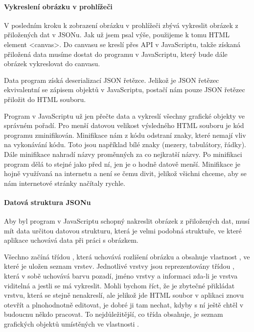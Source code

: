 \documentclass[
  field=inf,
  biblatex,
  glossaries,
  index
]{kidiplom}
\begin{document}
\paragraph{Vykreslení obrázku v prohlížeči}
V posledním kroku k zobrazení obrázku v prohlížeči zbývá vykreslit obrázek z přiložených dat v JSONu. Jak už jsem psal výše, použijeme k tomu HTML element <canvas>. Do canvasu se kreslí přes API v JavaScriptu, takže získaná přiložená data musíme dostat do programu v JavaScriptu, který bude dále obrázek vykreslovat do canvasu. 

Data program získá deserializací JSON řetězce. Jelikož je JSON řetězec ekvivalentní se zápisem objektů v JavaScriptu, postačí nám pouze JSON řetězec přiložit do HTML souboru.

Program v JavaScriptu už jen přečte data a vykreslí všechny grafické objekty ve správném pořadí. Pro menší datovou velikost výsledného HTML souboru je kód programu zminifikován. Minifikace nám z kódu odstraní znaky, které nemají vliv na vykonávání kódu. Toto jsou například bílé znaky (mezery, tabulátory, řádky). Dále minifikace nahradí názvy proměnných za co nejkratší názvy. Po minifikaci program dělá to stejné jako před ní, jen je o hodně datově menší. Minifikace je hojně využívaná na internetu a není se čemu divit, jelikož všichni chceme, aby se nám internetové stránky načítaly rychle.

\paragraph{Datová struktura JSONu}
Aby byl program v JavaScriptu schopný nakreslit obrázek z přiložených dat, musí mít data určitou datovou strukturu, která je velmi podobná struktuře, ve které aplikace uchovává data při práci s obrázkem.

Všechno začíná třídou , která uchovává rozlišení obrázku a obsahuje vlastnost , ve které je uložen seznam vrstev. Jednotlivé vrstvy jsou reprezentovány třídou , která v sobě uchovává barvu pozadí, jméno vrstvy a informaci zda-li je vrstva viditelná a jestli se má vykreslit. Mohli bychom říct, že je zbytečné přikládat vrstvu, která se stejně nenakreslí, ale jelikož jde HTML soubor v aplikaci znovu otevřít a plnohodnotně editovat, je dobré ji tam nechat, kdyby s ní ještě chtěl v budoucnu někdo pracovat. To nejdůležitější, co třída  obsahuje, je seznam grafických objektů umístěných ve vlastnosti .
\end{document}
